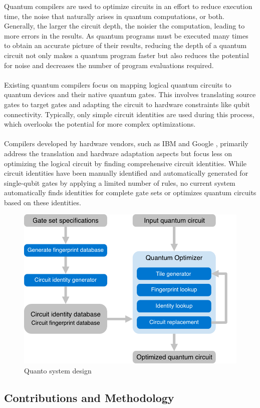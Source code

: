 Quantum compilers are used to optimize circuits in an effort to reduce execution time, the noise that naturally arises in quantum computations, or both. Generally, the larger the circuit depth, the noisier the computation, leading to more errors in the results. As quantum programs must be executed many times to obtain an accurate picture of their results, reducing the depth of a quantum circuit not only makes a quantum program faster but also reduces the potential for noise and decreases the number of program evaluations required.
\\\\
Existing quantum compilers focus on mapping logical quantum circuits to quantum devices and their native quantum gates. This involves translating source gates to target gates and adapting the circuit to hardware constraints like qubit connectivity. Typically, only simple circuit identities are used during this process, which overlooks the potential for more complex optimizations.
\\\\
Compilers developed by hardware vendors, such as IBM \cite{2017qiskit} and Google \cite{2018cirq}, primarily address the translation and hardware adaptation aspects but focus less on optimizing the logical circuit by finding comprehensive circuit identities. While circuit identities have been manually identified and automatically generated for single-qubit gates by applying a limited number of rules, no current system automatically finds identities for complete gate sets or optimizes quantum circuits based on these identities.

\begin{figure}
  \includegraphics[width=0.7\columnwidth]{assets/quanto_system.png}
  \caption{Quanto system design}
  \label{fig:quanto_system}
\end{figure}
\subsection{Contributions and Methodology}


